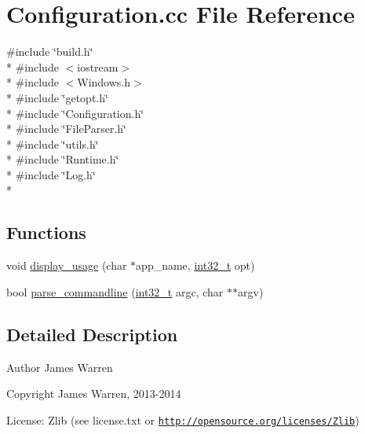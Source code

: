 \section{Configuration.\-cc File Reference}
\label{_configuration_8cc}
{\ttfamily \#include \char`\"{}build.\-h\char`\"{}}\\*
{\ttfamily \#include $<$iostream$>$}\\*
{\ttfamily \#include $<$Windows.\-h$>$}\\*
{\ttfamily \#include \char`\"{}getopt.\-h\char`\"{}}\\*
{\ttfamily \#include \char`\"{}Configuration.\-h\char`\"{}}\\*
{\ttfamily \#include \char`\"{}File\-Parser.\-h\char`\"{}}\\*
{\ttfamily \#include \char`\"{}utils.\-h\char`\"{}}\\*
{\ttfamily \#include \char`\"{}Runtime.\-h\char`\"{}}\\*
{\ttfamily \#include \char`\"{}Log.\-h\char`\"{}}\\*
\subsection*{Functions}
\begin{DoxyCompactItemize}
\item 
void \hyperlink{_configuration_8cc_a60ca01793aec53a00452adb2caf780dc}{display\-\_\-usage} (char $\ast$app\-\_\-name, \hyperlink{stdint_8h_a32f2e37ee053cf2ce8ca28d1f74630e5}{int32\-\_\-t} opt)
\item 
bool \hyperlink{_configuration_8cc_a77d8ecb3e2084eecf8db1cf62276bcf0}{parse\-\_\-commandline} (\hyperlink{stdint_8h_a32f2e37ee053cf2ce8ca28d1f74630e5}{int32\-\_\-t} argc, char $\ast$$\ast$argv)
\end{DoxyCompactItemize}


\subsection{Detailed Description}
\begin{DoxyAuthor}{Author}
James Warren 
\end{DoxyAuthor}
\begin{DoxyCopyright}{Copyright}
James Warren, 2013-\/2014 
\end{DoxyCopyright}
\begin{DoxyParagraph}{License\-:}
Zlib (see license.\-txt or \href{http://opensource.org/licenses/Zlib}{\tt http\-://opensource.\-org/licenses/\-Zlib}) 
\end{DoxyParagraph}


